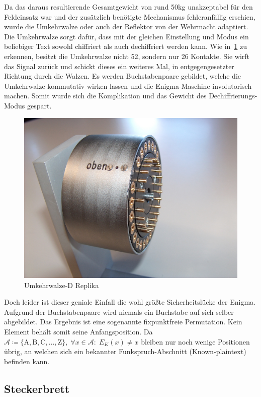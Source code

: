 Da das daraus resultierende Gesamtgewicht von rund 50\si{\kg} unakzeptabel für den Feldeinsatz war und der zusätzlich benötigte Mechanismus fehleranfällig erschien, wurde die Umkehrwalze oder auch der Reflektor von der Wehrmacht adaptiert.
Die Umkehrwalze sorgt dafür, dass 
mit der gleichen Einstellung und \glqq Modus\grqq{} ein beliebiger Text sowohl chiffriert als auch dechiffriert werden kann.
Wie in~\cref{fig:enigma_reflector} zu erkennen, besitzt die Umkehrwalze nicht 52, sondern nur 26 Kontakte.
Sie \glqq wirft\grqq{} das Signal zurück und schickt dieses ein weiteres Mal, in entgegengesetzter Richtung durch die Walzen.
Es werden Buchstabenpaare gebildet, welche die Umkehrwalze kommutativ wirken lassen und die Enigma-Maschine involutorisch machen.
Somit wurde sich die Komplikation und das Gewicht des Dechiffrierungs-Modus gespart.

\begin{figure}[htbp]
	\centering
	\includegraphics[width=.5\linewidth]{Enigma/UKW-D}
	\caption{Umkehrwalze-D Replika\autocite{enigmareflektor}}
	\label{fig:enigma_reflector}
\end{figure}

Doch leider ist dieser geniale Einfall die wohl größte Sicherheitslücke der Enigma.
Aufgrund der Buchstabenpaare wird niemals ein Buchstabe auf sich selber abgebildet.
Das Ergebnis ist eine sogenannte fixpunktfreie Permutation.
Kein Element behält somit seine Anfangsposition.
Da $\mathcal{A}\coloneqq\{\mathrm{A}, \mathrm{B}, \mathrm{C}, \ldots, \mathrm{Z}\},\; \forall x \in \mathcal{A}:\; E_K(x) \ne x$ bleiben nur noch wenige Positionen übrig, an welchen sich ein bekannter Funkspruch-Abschnitt (Known-plaintext) befinden kann.


\subsection{Steckerbrett}\label{subsec:steckerbrett}

